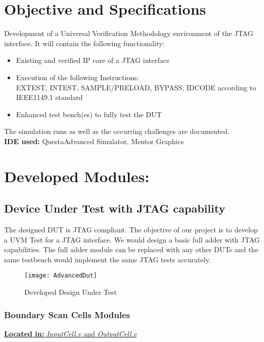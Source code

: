 \documentclass[a4paper,11pt]{article}
\begin{document}
\newpage
\pagebreak
\section{Objective and Specifications}

Development of a Universal Verification Methodology environment of the JTAG interface. It will contain the following functionality:

\begin{itemize}
\item Existing and verified IP core of a JTAG interface
\item Execution of the following Instructions: \\EXTEST, INTEST, SAMPLE/PRELOAD, BYPASS, IDCODE according to IEEE1149.1 standard
\item Enhanced test bench(es) to fully test the DUT
\end{itemize}

The simulation runs as well as the occurring challenges are documented.
\\ \textbf{IDE used:} Questa\textregistered Advanced Simulator, Mentor Graphics

\newpage
\pagebreak
\section{Developed Modules:}

\subsection{Device Under Test with JTAG capability}
The designed DUT is JTAG compliant. The objective of our project is to develop a UVM Test for a JTAG interface. We would design a basic full adder with JTAG capabilities. The full adder module can be replaced with any other DUTs and the same testbench would implement the same JTAG tests accurately.

\begin{figure}[ht]
\centering
\texttt{[image: AdvancedDut]}
\caption{Developed Design Under Test}
\label{fig:developed DUT}
\end{figure}

\FloatBarrier
\subsubsection{Boundary Scan Cells Modules}
\underline{\textbf{Located in:} \textit{InputCell.v} and \textit{OutputCell.v}}\\
\end{document}

